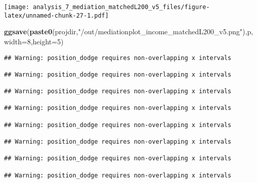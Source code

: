 \documentclass[
]{article}
\newenvironment{Shaded}{\begin{snugshade}}{\end{snugshade}}
\newcommand{\DataTypeTok}[1]{\textcolor[rgb]{0.13,0.29,0.53}{#1}}
\newcommand{\DecValTok}[1]{\textcolor[rgb]{0.00,0.00,0.81}{#1}}
\newcommand{\KeywordTok}[1]{\textcolor[rgb]{0.13,0.29,0.53}{\textbf{#1}}}
\newcommand{\NormalTok}[1]{#1}
\newcommand{\StringTok}[1]{\textcolor[rgb]{0.31,0.60,0.02}{#1}}
\begin{document}
\texttt{[image: analysis\_7\_mediation\_matchedL200\_v5\_files/figure-latex/unnamed-chunk-27-1.pdf]}

\begin{Shaded}
\begin{Highlighting}[]
\KeywordTok{ggsave}\NormalTok{(}\KeywordTok{paste0}\NormalTok{(projdir,}\StringTok{"/out/mediationplot_income_matchedL200_v5.png"}\NormalTok{),p,}\DataTypeTok{width=}\DecValTok{8}\NormalTok{,}\DataTypeTok{height=}\DecValTok{5}\NormalTok{)}
\end{Highlighting}
\end{Shaded}

\begin{verbatim}
## Warning: position_dodge requires non-overlapping x intervals

## Warning: position_dodge requires non-overlapping x intervals

## Warning: position_dodge requires non-overlapping x intervals

## Warning: position_dodge requires non-overlapping x intervals

## Warning: position_dodge requires non-overlapping x intervals

## Warning: position_dodge requires non-overlapping x intervals

## Warning: position_dodge requires non-overlapping x intervals

## Warning: position_dodge requires non-overlapping x intervals
\end{verbatim}
\end{document}

